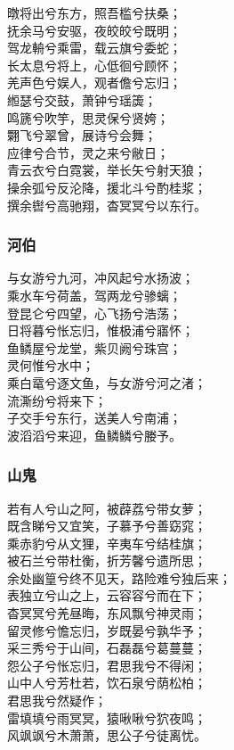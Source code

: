 \documentclass[]{article}
\begin{document}
暾将出兮东方，照吾槛兮扶桑；\\
抚余马兮安驱，夜皎皎兮既明；\\
驾龙輈兮乘雷，载云旗兮委蛇；\\
长太息兮将上，心低徊兮顾怀；\\
羌声色兮娱人，观者儋兮忘归；\\
縆瑟兮交鼓，萧钟兮瑶簴；\\
鸣篪兮吹竽，思灵保兮贤姱；\\
翾飞兮翠曾，展诗兮会舞；\\
应律兮合节，灵之来兮敝日；\\
青云衣兮白霓裳，举长矢兮射天狼；\\
操余弧兮反沦降，援北斗兮酌桂浆；\\
撰余辔兮高驰翔，杳冥冥兮以东行。

\hypertarget{header-n51}{%
\subsubsection{河伯}\label{header-n51}}

与女游兮九河，冲风起兮水扬波；\\
乘水车兮荷盖，驾两龙兮骖螭；\\
登昆仑兮四望，心飞扬兮浩荡；\\
日将暮兮怅忘归，惟极浦兮寤怀；\\
鱼鳞屋兮龙堂，紫贝阙兮珠宫；\\
灵何惟兮水中；\\
乘白鼋兮逐文鱼，与女游兮河之渚；\\
流澌纷兮将来下；\\
子交手兮东行，送美人兮南浦；\\
波滔滔兮来迎，鱼鳞鳞兮媵予。

\hypertarget{header-n56}{%
\subsubsection{山鬼}\label{header-n56}}

若有人兮山之阿，被薜荔兮带女萝；\\
既含睇兮又宜笑，子慕予兮善窈窕；\\
乘赤豹兮从文狸，辛夷车兮结桂旗；\\
被石兰兮带杜衡，折芳馨兮遗所思；\\
余处幽篁兮终不见天，路险难兮独后来；\\
表独立兮山之上，云容容兮而在下；\\
杳冥冥兮羌昼晦，东风飘兮神灵雨；\\
留灵修兮憺忘归，岁既晏兮孰华予；\\
采三秀兮于山间，石磊磊兮葛蔓蔓；\\
怨公子兮怅忘归，君思我兮不得闲；\\
山中人兮芳杜若，饮石泉兮荫松柏；\\
君思我兮然疑作；\\
雷填填兮雨冥冥，猿啾啾兮狖夜鸣；\\
风飒飒兮木萧萧，思公子兮徒离忧。
\end{document}
